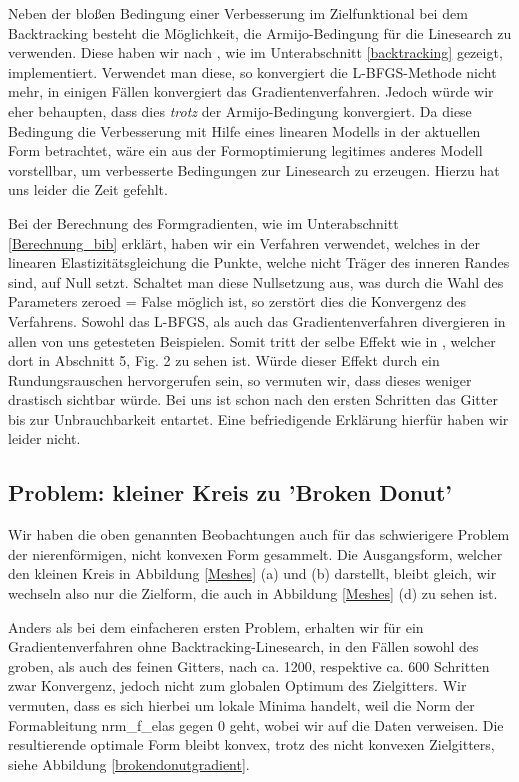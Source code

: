 Neben der bloßen Bedingung einer Verbesserung im Zielfunktional bei dem Backtracking besteht die Möglichkeit, die Armijo-Bedingung für die Linesearch zu verwenden. Diese haben wir nach \cite{Nocedal}, wie im Unterabschnitt  \ref{backtracking} gezeigt,  implementiert. Verwendet man diese, so konvergiert die L-BFGS-Methode nicht mehr, in einigen Fällen konvergiert das Gradientenverfahren. Jedoch würde wir eher behaupten, dass dies \textit{trotz} der Armijo-Bedingung konvergiert. Da diese Bedingung die Verbesserung mit Hilfe eines linearen Modells in der aktuellen Form betrachtet, wäre ein aus der Formoptimierung legitimes anderes Modell vorstellbar, um verbesserte Bedingungen zur Linesearch zu erzeugen. Hierzu hat uns leider die Zeit gefehlt.

Bei der Berechnung des Formgradienten, wie im Unterabschnitt \ref{Berechnung_bib} erklärt, haben wir ein Verfahren verwendet, welches in der linearen Elastizitätsgleichung die Punkte, welche nicht Träger des inneren Randes sind, auf Null setzt. Schaltet man diese Nullsetzung aus, was durch die Wahl des Parameters \textsf{zeroed = False} möglich ist, so zerstört dies die Konvergenz des Verfahrens. Sowohl das L-BFGS, als auch das Gradientenverfahren divergieren in allen von uns getesteten Beispielen. Somit tritt der selbe Effekt wie in \cite{bfgs2}, welcher dort in Abschnitt 5, Fig. 2 zu sehen ist. Würde dieser Effekt durch ein Rundungsrauschen hervorgerufen sein, so vermuten wir, dass dieses weniger drastisch sichtbar würde. Bei uns ist schon nach den ersten Schritten das Gitter bis zur Unbrauchbarkeit entartet. Eine befriedigende Erklärung hierfür haben wir leider nicht.

\subsection{Problem: kleiner Kreis zu 'Broken Donut'}\label{subsect_donut}

Wir haben die oben genannten Beobachtungen auch für das schwierigere Problem der nierenförmigen, nicht konvexen Form gesammelt. Die Ausgangsform, welcher den kleinen Kreis in Abbildung \ref{Meshes} (a) und (b) darstellt, bleibt gleich, wir wechseln also nur die Zielform, die auch in Abbildung \ref{Meshes} (d) zu sehen ist. 

Anders als bei dem einfacheren ersten Problem, erhalten wir für ein Gradientenverfahren ohne Backtracking-Linesearch, in den Fällen sowohl des groben, als auch des feinen Gitters, nach ca. 1200, respektive ca. 600 Schritten zwar Konvergenz, jedoch nicht zum globalen Optimum des Zielgitters. Wir vermuten, dass es sich hierbei um lokale Minima handelt, weil die Norm der Formableitung \textsf{nrm\_f\_elas} gegen $0$ geht, wobei wir auf die Daten verweisen. Die resultierende optimale Form bleibt konvex, trotz des nicht konvexen Zielgitters, siehe Abbildung
\ref{brokendonutgradient}. 

